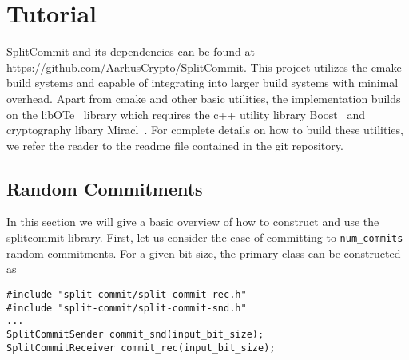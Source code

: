 
\section{Tutorial}
SplitCommit and its dependencies can be found at \url{https://github.com/AarhusCrypto/SplitCommit}. This project utilizes the cmake build systems and capable of integrating into larger build systems with minimal overhead. Apart from cmake and other basic utilities, the implementation builds on the libOTe~\cite{libOTe} library which requires the c++ utility library Boost~\cite{boost} and cryptography libary Miracl~\cite{miracl}. For complete details on how to build these utilities, we refer the reader to the readme file contained in the git repository.



%
%
%
%
%
%

\subsection{Random Commitments}
In this section we will give a basic overview of how to construct and use the splitcommit library. First, let us consider the case of committing to \texttt{num\_commits} random commitments. For a given bit size, the primary class can be constructed as
\begin{lstlisting}
#include "split-commit/split-commit-rec.h"
#include "split-commit/split-commit-snd.h"
...
SplitCommitSender commit_snd(input_bit_size);
SplitCommitReceiver commit_rec(input_bit_size);
\end{lstlisting}

